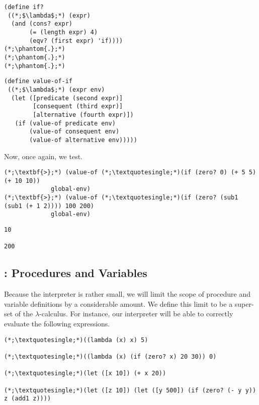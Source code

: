 \begin{clrr}[]{}
\begin{lstlisting}[language=MyScheme]
(define if?
 ((*;$\lambda$;*) (expr)
  (and (cons? expr)
       (= (length expr) 4)
       (eqv? (first expr) 'if))))
(*;\phantom{.};*)
(*;\phantom{.};*)
(*;\phantom{.};*)
\end{lstlisting}
\tcblower
\begin{lstlisting}[language=MyNLNScheme]
(define value-of-if
 ((*;$\lambda$;*) (expr env)
  (let ([predicate (second expr)]
        [consequent (third expr)]
        [alternative (fourth expr)])
   (if (value-of predicate env)
       (value-of consequent env)
       (value-of alternative env)))))
\end{lstlisting}\end{clrr}

\noindent Now, once again, we test.

\begin{clonarrow}[]{}
\begin{lstlisting}[language=MySOutput]
(*;\textbf{>};*) (value-of (*;\textquotesingle;*)(if (zero? 0) (+ 5 5) (+ 10 10)) 
             global-env)
(*;\textbf{>};*) (value-of (*;\textquotesingle;*)(if (zero? (sub1 (sub1 (+ 1 2)))) 100 200) 
             global-env)
\end{lstlisting}
\tcblower
\begin{lstlisting}[language=MyOutput]
10

200
\end{lstlisting}
\end{clonarrow}

\clearpage
\subsection*{: Procedures and Variables}

Because the interpreter is rather small, we will limit the scope of procedure and variable definitions by a considerable amount. We define this limit to be a super-set of the $\lambda$-calculus. For instance, our interpreter will be able to correctly evaluate the following expressions.

\begin{cl}[]{}\begin{lstlisting}[language=MyNLNSOutput]
(*;\textquotesingle;*)((lambda (x) x) 5)

(*;\textquotesingle;*)((lambda (x) (if (zero? x) 20 30)) 0)

(*;\textquotesingle;*)(let ([x 10]) (+ x 20))

(*;\textquotesingle;*)(let ([z 10]) (let ([y 500]) (if (zero? (- y y)) z (add1 z))))
\end{lstlisting}\end{cl}


